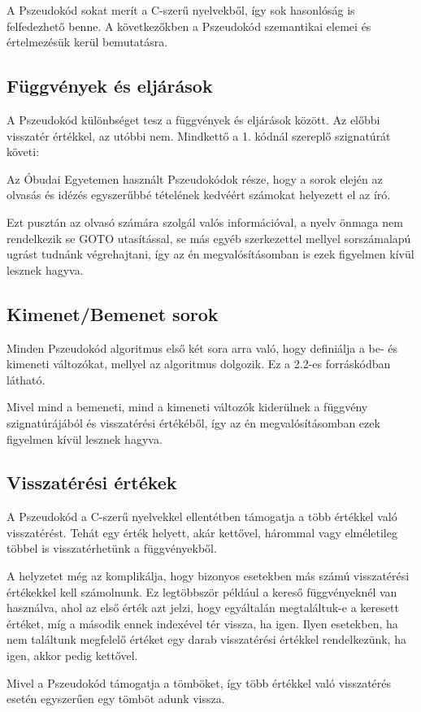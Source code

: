 A Pszeudokód sokat merít a C-szerű nyelvekből, így sok hasonlóság is felfedezhető benne. A következőkben a Pszeudokód szemantikai elemei és értelmezésük kerül bemutatásra.



\subsection{Függvények és eljárások}

A Pszeudokód különbséget tesz a függvények és eljárások között. Az előbbi visszatér értékkel, az utóbbi nem. Mindkettő a 1. kódnál szereplő szignatúrát követi:

Az Óbudai Egyetemen használt Pszeudokódok része, hogy a sorok elején az olvasás és idézés egyszerűbbé tételének kedvéért számokat helyezett el az író.

Ezt pusztán az olvasó számára szolgál valós információval, a nyelv önmaga nem rendelkezik se GOTO utasítással, se más egyéb szerkezettel mellyel sorszámalapú ugrást tudnánk végrehajtani, így az én megvalósításomban is ezek figyelmen kívül lesznek hagyva.

\subsection{Kimenet/Bemenet sorok}

Minden Pszeudokód algoritmus első két sora arra való, hogy definiálja a be- és kimeneti változókat, mellyel az algoritmus dolgozik. Ez a 2.2-es forráskódban látható.

Mivel mind a bemeneti, mind a kimeneti változók kiderülnek a függvény szignatúrájából és visszatérési értékéből, így az én megvalósításomban ezek figyelmen kívül lesznek hagyva.

\subsection{Visszatérési értékek}

A Pszeudokód a C-szerű nyelvekkel ellentétben támogatja a több értékkel való visszatérést. Tehát egy érték helyett, akár kettővel, hárommal vagy elméletileg többel is visszatérhetünk a függvényekből.

A helyzetet még az komplikálja, hogy bizonyos esetekben más számú visszatérési értékekkel kell számolnunk. Ez legtöbbször például a kereső függvényeknél van használva, ahol az első érték azt jelzi, hogy egyáltalán megtaláltuk-e a keresett értéket, míg a második ennek indexével tér vissza, ha igen. Ilyen esetekben, ha nem találtunk megfelelő értéket egy darab visszatérési értékkel rendelkezünk, ha igen, akkor pedig kettővel.

Mivel a Pszeudokód támogatja a tömböket, így több értékkel való visszatérés esetén egyszerűen egy tömböt adunk vissza.